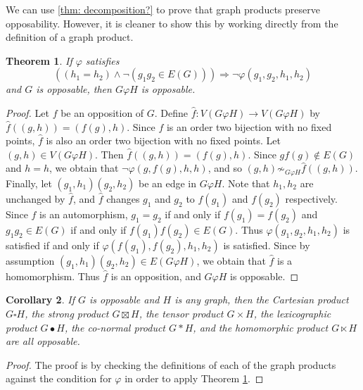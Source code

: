 \documentclass[11pt]{article}
\newtheorem{theorem}{Theorem}[section]
\newtheorem{corollary}[theorem]{Corollary}
\theoremstyle{definition}
\begin{document}
We can use \cref{thm: decomposition?} to prove that graph products preserve
opposability. However, it is cleaner to show this by working directly from the
definition of a graph product.

\begin{theorem}
    \label{thm:graphProdOpposableLogic}
    If $\varphi$ satisfies 
    \[
        ((h_1=h_2)\wedge\neg(g_1g_2\in E(G)))\Rightarrow\neg
        \varphi(g_1,g_2,h_1,h_2)
    \]
    and $G$ is opposable, then $G\varphi H$ is opposable.
\end{theorem}

\begin{proof}
    Let $f$ be an opposition of $G$. Define $\hat{f}:V(G\varphi H)\rightarrow
    V(G\varphi H)$ by $\hat{f}((g,h))=(f(g),h)$. Since $f$ is an order two
    bijection with no fixed points, $\hat{f}$ is also an order two bijection
    with no fixed points. Let $(g,h)\in V(G\varphi H)$. Then
    $\hat{f}((g,h))=(f(g),h)$. Since $gf(g)\not\in E(G)$ and $h=h$, we obtain
    that $\neg \varphi(g,f(g),h,h)$, and so $(g,h) \not\sim_{G\varphi H}
    \hat{f}((g,h))$. Finally, let $(g_1,h_1)(g_2,h_2)$ be an edge in $G\varphi
    H$. Note that $h_1,h_2$ are unchanged by $\hat{f}$, and $\hat{f}$ changes
    $g_1$ and $g_2$ to $f(g_1)$ and $f(g_2)$ respectively. Since $f$ is an
    automorphism, $g_1=g_2$ if and only if $f(g_1)=f(g_2)$ and $g_1g_2\in E(G)$
    if and only if $f(g_1)f(g_2)\in E(G)$. Thus $\varphi(g_1,g_2,h_1,h_2)$ is
    satisfied if and only if $\varphi(f(g_1),f(g_2),h_1,h_2)$ is satisfied.
    Since by assumption $(g_1,h_1)(g_2,h_2)\in E(G\varphi H)$, we obtain that
    $\hat{f}$ is a homomorphism. Thus $\hat{f}$ is an opposition, and $G\varphi
    H$ is opposable.
\end{proof}

\begin{corollary}
    \label{cor: graph products preserve opposable}
    If $G$ is opposable and $H$ is any graph, then the Cartesian product
    $G\square H$, the strong product $G\boxtimes H$, the tensor product
    $G\times H$, the lexicographic product $G\bullet H$, the co-normal product
    $G*H$, and the homomorphic product $G\ltimes H$ are all opposable.
\end{corollary}

\begin{proof}
    The proof is by checking the definitions of each of the graph products
    against the condition for $\varphi$ in order to apply Theorem
    \ref{thm:graphProdOpposableLogic}.
\end{proof}
\end{document}
